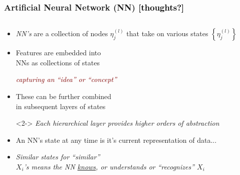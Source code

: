 \documentclass[xcolor={dvipsnames}]{beamer}
\begin{document}
\frame
{
 \frametitle{Artificial Neural Network (NN) \textcolor{black}{[thoughts?]}}

\begin{columns}
\begin{column}{.6\textwidth}
\begin{itemize}
\item  \emph{NN's} are a collection of nodes $\eta^{(l)}_j$ that take on various states $\left\{\eta^{(l)}_j\right\}$
\item Features are embedded into\\ NNs as collections of states  
\item[] \textcolor{Maroon}{\emph{capturing an ``idea'' or ``concept''}}
\item These can be further combined\\ in subsequent layers of states
\item[]<2-> \textcolor{NavyBlue}{\emph{Each hierarchical layer provides higher orders of abstraction}}
\item<3-> An NN's state at any time is it's current representation of data...
\item[]
\item<4->[] \emph{Similar states for ``similar'' \\$X_i$'s means the NN \underline{knows}, or understands or ``recognizes'' $X_i$} 
\item[] 
\end{itemize}
\end{column}
\begin{column}{.5\textwidth}
\vspace{.25em}
\end{column}
\end{columns}


}
\end{document}
